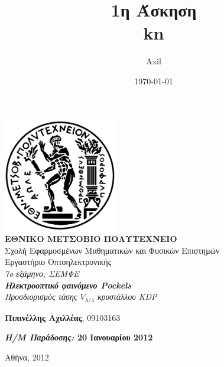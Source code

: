 \documentclass[a4paper,11pt,titlepage]{article}
\title{1η Άσκηση\\kn}
\author{Axil}
\date{\today}
\begin{document}
\pagestyle{headings}    %

\begin{titlepage}
\begin{center}
\includegraphics[width=50mm]{pyrforos.pdf}\\[0.5cm]
\textbf{\LARGE ΕΘΝΙΚΟ ΜΕΤΣΟΒΙΟ ΠΟΛΥΤΕΧΝΕΙΟ}\\
\textrm{\Large Σχολή Εφαρμοσμένων Μαθηματικών και Φυσικών Επιστημών}\\[2.0cm]
\Huge{Εργαστήριο Οπτοηλεκτρονικής}\\
\Large{\textit{7o εξάμηνο, ΣΕΜΦΕ}}\\[2.0cm]
\Large{\textit{\textbf{Ηλεκτροοπτικό φαινόμενο Pockels}\\Προσδιορισμός τάσης $V_{\lambda /4}$ κρυστάλλου KDP}}\\[5.0cm]
\normalsize
\begin{minipage}{0.49\textwidth}
\begin{flushleft}
\textbf{Πιπινέλλης Αχιλλέας}, 09103163
\end{flushleft}
\end{minipage}
\begin{minipage}{0.49\textwidth}
\begin{flushright}
\textbf{\textit{Η/Μ Παράδοσης:} 20 Ιανουαρίου 2012}
\end{flushright}
\end{minipage}

\vfill
{Αθήνα, 2012}

\end{center}
\end{titlepage}

\end{document}

